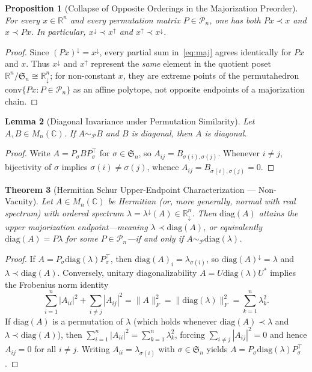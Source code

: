 \documentclass[11pt]{article}
\newtheorem{theorem}{Theorem}[section]
\newtheorem{proposition}[theorem]{Proposition}
\newtheorem{lemma}[theorem]{Lemma}
\theoremstyle{definition}
\theoremstyle{remark}
\newcommand{\R}{\mathbb{R}}
\newcommand{\C}{\mathbb{C}}
\newcommand{\Pn}{\mathcal{P}_n}
\newcommand{\diag}{\mathrm{diag}}
\begin{document}
\begin{proposition}[Collapse of Opposite Orderings in the Majorization Preorder]
\label{prop:collapse}
For every $x \in \R^n$ and every permutation matrix $P \in \Pn$, one has both
$P x \prec x$ and $x \prec P x$. In particular, $x^\downarrow \prec x^\uparrow$
and $x^\uparrow \prec x^\downarrow$.
\end{proposition}
\begin{proof}
Since $(Px)^\downarrow = x^\downarrow$, every partial sum in~\eqref{eq:maj} agrees
identically for $P x$ and $x$. Thus $x^\downarrow$ and $x^\uparrow$ represent the
\emph{same} element in the quotient poset $\R^n/\mathfrak{S}_n \cong \R_\downarrow^n$;
for non-constant $x$, they are extreme points of the permutahedron
$\mathrm{conv}\{Px : P\in\Pn\}$ as an affine polytope, not opposite endpoints of
a majorization chain.
\end{proof}

\begin{lemma}[Diagonal Invariance under Permutation Similarity]
\label{lem:diag-inv}
Let $A, B \in M_n(\C)$. If $A \sim_{\mathcal{P}} B$ and $B$ is diagonal, then $A$
is diagonal.
\end{lemma}
\begin{proof}
Write $A = P_\sigma B P_\sigma^\top$ for $\sigma \in \mathfrak{S}_n$, so
$A_{ij} = B_{\sigma(i),\sigma(j)}$. Whenever $i \neq j$, bijectivity of $\sigma$
implies $\sigma(i) \neq \sigma(j)$, whence $A_{ij} = B_{\sigma(i),\sigma(j)} = 0$.
\end{proof}

\begin{theorem}[Hermitian Schur Upper-Endpoint Characterization --- Non-Vacuity]
\label{thm:schur-upper}
Let $A \in M_n(\C)$ be Hermitian (or, more generally, normal with real spectrum)
with ordered spectrum $\lambda = \lambda^\downarrow(A) \in \R_\downarrow^n$. Then
$\diag(A)$ attains the upper majorization endpoint---meaning $\lambda \prec \diag(A)$,
or equivalently $\diag(A) = P\lambda$ for some $P \in \Pn$---if and only if
$A \sim_{\mathcal{P}} \diag(\lambda)$.
\end{theorem}
\begin{proof}
If $A = P_\sigma \diag(\lambda) P_\sigma^\top$, then $\diag(A)_i = \lambda_{\sigma(i)}$,
so $\diag(A)^\downarrow = \lambda$ and $\lambda \prec \diag(A)$. Conversely,
unitary diagonalizability $A = U \diag(\lambda) U^*$ implies the Frobenius norm
identity
\[
  \sum_{i=1}^n |A_{ii}|^2 + \sum_{i \neq j} |A_{ij}|^2
  = \|A\|_F^2 = \|\diag(\lambda)\|_F^2 = \sum_{k=1}^n \lambda_k^2.
\]
If $\diag(A)$ is a permutation of $\lambda$ (which holds whenever
$\diag(A) \prec \lambda$ and $\lambda \prec \diag(A)$), then
$\sum_{i=1}^n |A_{ii}|^2 = \sum_{k=1}^n \lambda_k^2$, forcing
$\sum_{i \neq j} |A_{ij}|^2 = 0$ and hence $A_{ij} = 0$ for all $i \neq j$. Writing
$A_{ii} = \lambda_{\sigma(i)}$ with $\sigma \in \mathfrak{S}_n$ yields
$A = P_\sigma \diag(\lambda) P_\sigma^\top$.
\end{proof}
\end{document}
